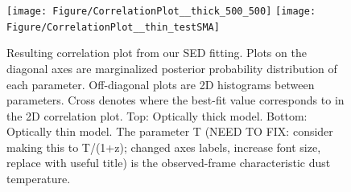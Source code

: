 \documentclass{emulateapj}
\begin{document}
\begin{figure}[!tbp]
\centering
\texttt{[image: Figure/CorrelationPlot\_\_thick\_500\_500]}
\texttt{[image: Figure/CorrelationPlot\_\_thin\_testSMA]}
\caption{Resulting correlation plot from our SED fitting. Plots on the diagonal axes are marginalized posterior probability 
distribution of each
parameter. Off-diagonal plots are 2D histograms between parameters. Cross denotes where the best-fit value corresponds to in 
the 2D correlation plot. Top: Optically thick
model. Bottom: Optically thin model. The parameter T (NEED TO FIX: consider making this to T/(1+z); changed axes labels, increase font size, replace with useful title) is the observed-frame characteristic dust temperature.
\label{fig:sedlikelihood}}
\end{figure}
\end{document}
